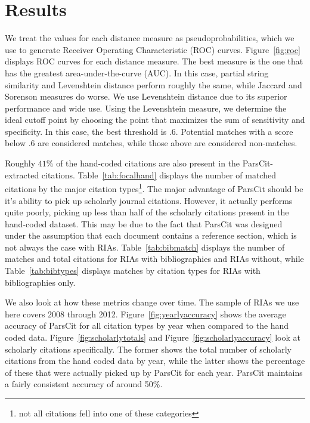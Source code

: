 \documentclass[12pt]{article}
\begin{document}
\section{Results}
We treat the values for each distance measure as pseudoprobabilities, which we use to generate Receiver Operating Characteristic (ROC) curves. Figure~\ref{fig:roc} displays ROC curves for each distance measure. The best measure is the one that has the greatest area-under-the-curve (AUC). In this case, partial string similarity and Levenshtein distance perform roughly the same, while Jaccard and Sorenson measures do worse. We use Levenshtein distance due to its superior performance and wide use. Using the Levenshtein measure, we determine the ideal cutoff point by choosing the point that maximizes the sum of sensitivity and specificity. In this case, the best threshold is .6. Potential matches with a score below .6 are considered matches, while those above are considered non-matches.

Roughly $41\%$ of the hand-coded citations are also present in the ParsCit-extracted citations. Table~\ref{tab:focalhand} displays the number of matched citations by the major citation types\footnote{not all citations fell into one of these categories}. The major advantage of ParsCit should be it's ability to pick up scholarly journal citations. However, it actually performs quite poorly, picking up less than half of the scholarly citations present in the hand-coded dataset. This may be due to the fact that ParsCit was designed under the assumption that each document contains a reference section, which is not always the case with RIAs. Table~\ref{tab:bibmatch} displays the number of matches and total citations for RIAs with bibliographies and RIAs without, while Table~\ref{tab:bibtypes} displays matches by citation types for RIAs with bibliographies only.

We also look at how these metrics change over time. The sample of RIAs we use here covers 2008 through 2012. Figure~\ref{fig:yearlyaccuracy} shows the average accuracy of ParsCit for all citation types by year when compared to the hand coded data. Figure~\ref{fig:scholarlytotals} and Figure~\ref{fig:scholarlyaccuracy} look at scholarly citations specifically. The former shows the total number of scholarly citations from the hand coded data by year, while the latter shows the percentage of these that were actually picked up by ParsCit for each year. ParsCit maintains a fairly consistent accuracy of around 50\%.
\end{document}
